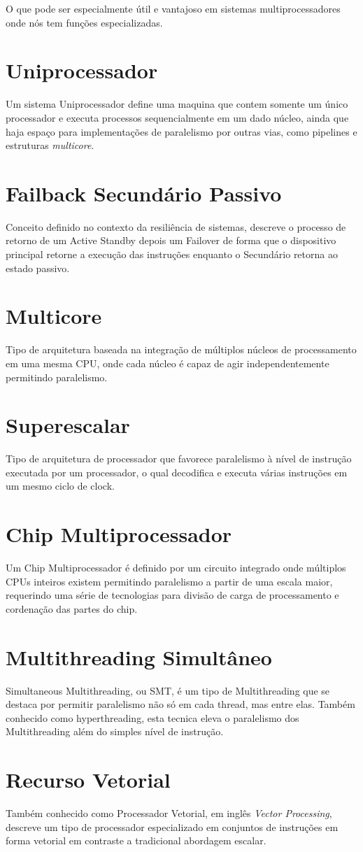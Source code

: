 \documentclass{article}
\begin{document}
O que pode ser especialmente útil e vantajoso em sistemas multiprocessadores onde nós tem funções especializadas.

\section*{Uniprocessador}
Um sistema Uniprocessador define uma maquina que contem somente um único processador e executa processos sequencialmente em um dado núcleo, ainda que haja espaço para implementações de paralelismo por outras vias, como pipelines e estruturas \emph{multicore}.

\section*{Failback Secundário Passivo} 
Conceito definido no contexto da resiliência de sistemas, descreve o processo de retorno de um Active Standby depois um Failover de forma que o dispositivo principal retorne a execução das instruções enquanto o Secundário retorna ao estado passivo.

\section*{Multicore}
Tipo de arquitetura baseada na integração de múltiplos núcleos de processamento em uma mesma CPU, onde cada núcleo é capaz de agir independentemente permitindo paralelismo.

\section*{Superescalar}
Tipo de arquitetura de processador que favorece paralelismo à nível de instrução executada por um processador, o qual decodifica e executa várias instruções em um mesmo ciclo de clock.

\section*{Chip Multiprocessador}
Um Chip Multiprocessador é definido por um circuito integrado onde múltiplos CPUs inteiros existem permitindo paralelismo a partir de uma escala maior, requerindo uma série de tecnologias para divisão de carga de processamento e cordenação das partes do chip.

\section*{Multithreading Simultâneo} 
Simultaneous Multithreading, ou SMT, é um tipo de Multithreading que se destaca por permitir paralelismo não só em cada thread, mas entre elas. Também conhecido como hyperthreading, esta tecnica eleva o paralelismo dos Multithreading além do simples nível de instrução.

\section*{Recurso Vetorial}
Também conhecido como Processador Vetorial, em inglês \emph{Vector Processing}, descreve um tipo de processador especializado em conjuntos de instruções em forma vetorial em contraste a tradicional abordagem escalar.  
\end{document}
